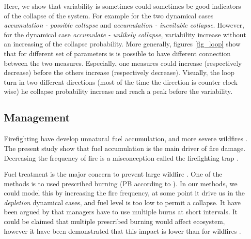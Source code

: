 \documentclass{article}
\begin{document}
Here, we show that variability is sometimes could sometimes be good indicators of the collapse of the system. For example for the two dynamical cases \textit{accumulation - possible collapse} and \textit{accumulation - inevitable collapse}. However, for the dynamical case \textit{accumulate - unlikely collapse}, variability increase without an increasing of the collapse probability. More generally, figures \ref{fig_loop} show that for different set of parameters is is possible to have different connection between the two measures. Especially, one measures could increase (respectively decrease) before the others increase (respectively decrease). Visually, the loop turn in two different directions (most of the time the direction is counter clock wise) he collapse probability increase and reach a peak before the variability.







\subsection{Management}

\paragraph{}
Firefighting have develop unnatural fuel accumulation, and more severe wildfires \citep{schoennagel_interaction_2004}. The present study show that fuel accumulation is the main driver of fire damage. Decreasing the frequency of fire is a misconception called the firefighting trap \citep{collins_forest_2013}.

Fuel treatment is the major concern to prevent large wildfire \citep{liu_studying_2013, martinson_performance_nodate}. One of the methods is to used prescribed burning (PB according to \cite{liu_analyzing_2010}). In our methods, we could model this by increasing the fire frequency, at some point it drive us in the \textit{depletion} dynamical cases, and fuel level is too low to permit a collapse. It have been argued by \cite{scholl_fire_2010} that managers have to use multiple burns at short intervals. It could be claimed that multiple prescribed burning would affect ecosystem, however it have been demonstrated that this impact is lower than for wildfires \citep{alcaniz2018effects, fultz2016forest, wiedinmyer2010prescribed}. 
\end{document}
